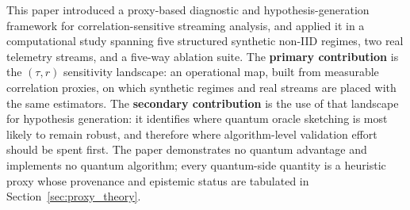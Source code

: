 \documentclass[sensors,article,submit,pdftex,moreauthors]{Definitions/mdpi}
\providecommand{\DIFadd}[1]{{\protect\color{blue}#1}} %
\providecommand{\DIFdel}[1]{} %
\providecommand{\DIFaddbegin}{} %
\providecommand{\DIFaddend}{} %
\providecommand{\DIFdelbegin}{} %
\providecommand{\DIFdelend}{} %
\begin{document}
This paper \DIFdelbegin \DIFdel{conducted }\DIFdelend \DIFaddbegin \DIFadd{introduced }\DIFaddend a proxy-based \DIFdelbegin \DIFdel{computational study of quantum oracle sketching performance across }\DIFdelend \DIFaddbegin \DIFadd{diagnostic and hypothesis-generation framework for correlation-sensitive streaming analysis, and applied it in a computational study spanning }\DIFaddend five structured synthetic non\nobreakdash-IID regimes, \DIFdelbegin \DIFdel{comparing proxy-based quantum estimates against three classical streaming baselines. }\DIFdelend \DIFaddbegin \DIFadd{two real telemetry streams, and a five-way ablation suite. The }\textbf{\DIFadd{primary contribution}} \DIFadd{is the $(\tau, r)$ sensitivity landscape: an operational map, built from measurable correlation proxies, on which synthetic regimes and real streams are placed with the same estimators. The }\textbf{\DIFadd{secondary contribution}} \DIFadd{is the use of that landscape for hypothesis generation: it identifies where quantum oracle sketching is most likely to remain robust, and therefore where algorithm-level validation effort should be spent first. The paper demonstrates no quantum advantage and implements no quantum algorithm; every quantum-side quantity is a heuristic proxy whose provenance and epistemic status are tabulated in Section~\ref{sec:proxy_theory}.
}\DIFaddend 
\end{document}
